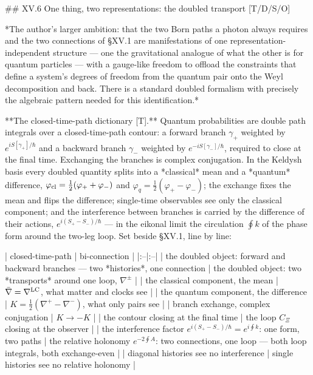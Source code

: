 ## XV.6 One thing, two representations: the doubled transport [T/D/S/O]

*The author's larger ambition: that the two Born paths a photon always requires and the two connections of §XV.1 are manifestations of one representation-independent structure — one the gravitational analogue of what the other is for quantum particles — with a gauge-like freedom to offload the constraints that define a system's degrees of freedom from the quantum pair onto the Weyl decomposition and back. There is a standard doubled formalism with precisely the algebraic pattern needed for this identification.*

**The closed-time-path dictionary [T].** Quantum probabilities are double path integrals over a closed-time-path contour: a forward branch $\gamma_+$ weighted by $e^{iS[\gamma_+]/\hbar}$ and a backward branch $\gamma_-$ weighted by $e^{-iS[\gamma_-]/\hbar}$, required to close at the final time. Exchanging the branches is complex conjugation. In the Keldysh basis every doubled quantity splits into a *classical* mean and a *quantum* difference, $\varphi_{\rm cl} = \tfrac12(\varphi_++\varphi_-)$ and $\varphi_q = \tfrac12(\varphi_+-\varphi_-)$; the exchange fixes the mean and flips the difference; single-time observables see only the classical component; and the interference between branches is carried by the difference of their actions, $e^{i(S_+-S_-)/\hbar}$ — in the eikonal limit the circulation $\oint k$ of the phase form around the two-leg loop. Set beside §XV.1, line by line:

| closed-time-path | bi-connection |
|:--|:--|
| the doubled object: forward and backward branches — two *histories*, one connection | the doubled object: two *transports* around one loop, $\nabla^\pm$ |
| the classical component, the mean | $\bar\nabla = \nabla^{\rm LC}$, what matter and clocks see |
| the quantum component, the difference | $K = \tfrac12(\nabla^+-\nabla^-)$, what only pairs see |
| branch exchange, complex conjugation | $K\to-K$ |
| the contour closing at the final time | the loop $C_\Xi$ closing at the observer |
| the interference factor $e^{i(S_+-S_-)/\hbar} = e^{i\oint k}$: one form, two paths | the relative holonomy $e^{-2\oint A}$: two connections, one loop — both loop integrals, both exchange-even |
| diagonal histories see no interference | single histories see no relative holonomy |

